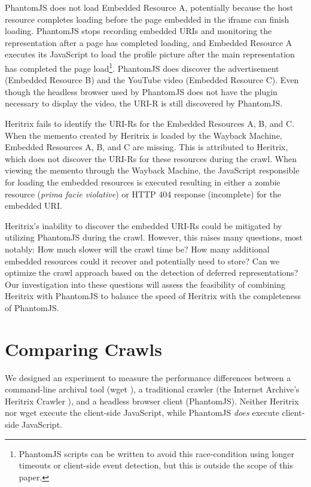\documentclass{ipres_proc_article-sp}
\begin{document}
PhantomJS does not load Embedded Resource A, potentially because the host resource completes loading before the page embedded in the iframe can finish loading. PhantomJS stops recording embedded URIs and monitoring the representation after a page has completed loading, and Embedded Resource A executes its JavaScript to load the profile picture after the main representation has completed the page load\footnote{PhantomJS scripts can be written to avoid this race-condition using longer timeouts or client-side event detection, but this is outside the scope of this paper.}.
 PhantomJS does discover the advertisement (Embedded Resource B) and the YouTube video (Embedded Resource C). Even though the headless browser used by PhantomJS does not have the plugin necessary to display the video, the URI-R is still discovered by PhantomJS.

Heritrix fails to identify the URI-Rs for the Embedded Resources A, B, and C. When the memento created by Heritrix is loaded by the Wayback Machine, Embedded Resources A, B, and C are missing. This is attributed to Heritrix, which does not discover the URI-Rs for these resources during the crawl. When viewing the memento through the Wayback Machine, the JavaScript responsible for loading the embedded resources is executed resulting in either a zombie resource (\emph{prima facie violative}) or HTTP 404 response (incomplete) for the embedded URI.

Heritrix's inability to discover the embedded URI-Rs could be mitigated by utilizing PhantomJS during the crawl. However, this raises many questions, most notably: How much slower will the crawl time be? How many additional embedded resources could it recover and potentially need to store? Can we optimize the crawl approach based on the detection of deferred representations? Our investigation into these questions will assess the feasibility of combining Heritrix with PhantomJS to balance the speed of Heritrix with the completeness of PhantomJS.


\section{Comparing Crawls}
\label{performance}
We designed an experiment to measure the performance differences between a command-line archival tool (wget \cite{wget}), a traditional crawler (the Internet Archive's Heritrix Crawler \cite{heritrix, Sigurosson:Incremental-Heritrix}), and a headless browser client (PhantomJS). Neither Heritrix nor wget execute the client-side JavaScript, while PhantomJS \emph{does} execute client-side JavaScript.
\end{document}
